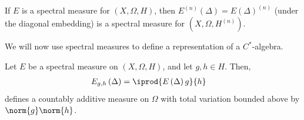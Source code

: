 \documentclass[10pt]{mypackage}
\begin{document}
\begin{example}
  If $E$ is a spectral measure for $\left( X,\Omega,H \right)$, then $E^{(n)}\left( \Delta \right)= E\left( \Delta \right)^{(n)}$ (under the diagonal embedding) is a spectral measure for $\left( X,\Omega,H^{(n)} \right)$.
\end{example}
We will now use spectral measures to define a representation of a $C^{\ast}$-algebra.
\begin{lemma}
  Let $E$ be a spectral measure on $\left( X,\Omega,H \right)$, and let $g,h\in H$. Then,
  \begin{align*}
    E_{g,h} \left( \Delta \right) &= \iprod{E\left( \Delta \right)g}{h}
  \end{align*}
  defines a countably additive measure on $\Omega$ with total variation bounded above by $\norm{g}\norm{h}$.
\end{lemma}
\end{document}
